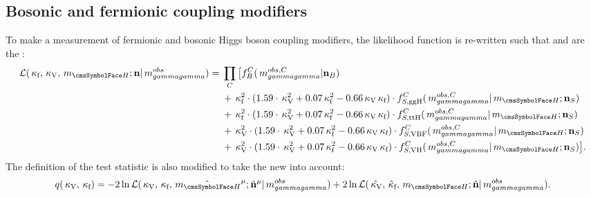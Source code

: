 \subsection{Bosonic and fermionic coupling modifiers}
To make a measurement of fermionic and bosonic Higgs boson coupling modifiers, the likelihood function is re-written such that \kf and \kV are the \POI\s: 
\begin{equation}
\label{eq:statandresults:likelihood_function_kvkf}
\begin{split}
\mathcal{L}(\kf,\kV, \mH; \mathbf{n} | \mgg^{obs} ) ={}&\prod_C \big[  f^C_B(\mgg^{obs,C} | \mathbf{n}_B )  \\ 
& + \kf^2\cdot(1.59\cdot\kV^2 + 0.07\kf^2 - 0.66\kV\kf) \cdot f^C_{S,{\text{ggH}}}(\mgg^{obs,C} |\mH; \mathbf{n}_S) \\ 
& + \kf^2\cdot(1.59\cdot\kV^2 + 0.07\kf^2 - 0.66\kV\kf) \cdot f^C_{S,{\text{ttH}}}(\mgg^{obs,C} |\mH; \mathbf{n}_S)  \\ 
& + \kV^2\cdot(1.59\cdot\kV^2 + 0.07\kf^2 - 0.66\kV\kf) \cdot f^C_{S,{\text{VBF}}}(\mgg^{obs,C} |\mH; \mathbf{n}_S)  \\
& + \kV^2\cdot(1.59\cdot\kV^2 + 0.07\kf^2 - 0.66\kV\kf) \cdot f^C_{S,{\text{VH}}}(\mgg^{obs,C} |\mH; \mathbf{n}_S)   \big]. 
\end{split}
\end{equation}
The definition of the test statistic is also modified to take the new \POI\s into account:
\begin{equation}
\label{eq:statandresults:test_statistic_kvkf}
 q(\kV,\kf)= -2 \ln \mathcal{L}(\kV,\kf,\hat{\mH}^{\mu}; \hat{\mathbf{n}}^{\mu}| \mgg^{obs})+ 2\ln\mathcal{L}(\hat{\kV},\hat{\kf},\mH;\hat{\mathbf{n}}| \mgg^{obs} ).
\end{equation}

